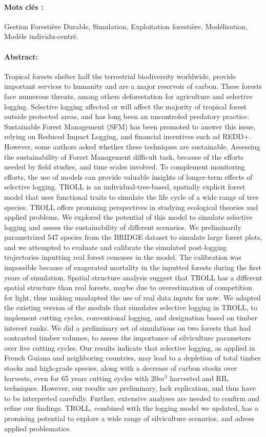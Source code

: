 {\paragraph{Mots clés :} Gestion Forestière Durable, Simulation, Exploitation forestière, Modélisation, Modèle individu-centré.
\paragraph{Abstract:}
Tropical forests shelter half the terrestrial biodiversity worldwide, provide important services to humanity and are a major reservoir of carbon. These forests face numerous threats, among others deforestation for agriculture and selective logging. Selective logging affected or will affect the majority of tropical forest outside protected areas, and has long been an uncontroled predatory practice. Sustainable Forest Management (SFM) has been promoted to answer this issue, relying on Reduced Impact Logging, and financial incentives such ad REDD+. However, some authors asked whether these techniques are sustainable. Assessing the sustainability of Forest Management difficult task, because of the efforts needed by field studies, and time scales involved. To complement monitoring efforts, the use of models can provide valuable insights of longer-term effects of selective logging. TROLL is an individual-tree-based, spatially explicit forest model that uses functional traits to simulate the life cycle of a wide range of tree species. TROLL offers promising perspectives in studying ecological theories and applied problems. We explored the potential of this model to simulate selective logging and assess the sustainability of different scenarios. We preliminarily parametrized 547 species from the BRIDGE dataset to simulate large forest plots, and we attempted to evaluate and calibrate the simulated post-logging trajectories inputting real forest censuses in the model. The calibration was impossible because of exagerated mortality in the inputted forests during the first years of simulation. Spatial structure analysis suggest that TROLL has a different spatial structure than real forests, maybe due to overestimation of competition for light, thus making unadapted the use of real data inputs for now. We adapted the existing version of the module that simulates selective logging in TROLL, to implement cutting cycles, conventional logging, and designation based on timber interest ranks. We did a preliminary set of simulations on two forests that had contrasted timber volumes, to assess the importance of silviculture parameters over five cutting cycles. Our results indicate that selective logging, as applied in French Guiana and neighboring countries, may lead to a depletion of total timber stocks and high-grade species, along with a decrease of carbon stocks over harvests, even for 65 years cutting cycles with 20$m^3$ harvested and RIL techniques. However, our results are preliminary, lack replication, and thus have to be interpreted carefully. Further, extensive analyses are needed to confirm and refine our findings. TROLL, combined with the logging model we updated, has a promising potential to explore a wide range of silviculture scenarios, and adress applied problematics.
}
